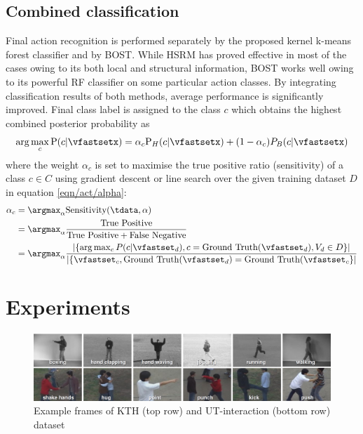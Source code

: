 \subsection{Combined classification} 
Final action recognition is performed separately by the proposed kernel k-means forest classifier and by BOST. While HSRM has proved effective in most of the cases owing to its both local and structural information, BOST works well owing to its powerful RF classifier on some particular action classes. By integrating classification results of both methods, average performance is significantly improved. Final class label is assigned to the class $c$ which obtains the highest combined posterior probability as
\begin{equation}
	\arg\max_{c}\mathrm{P}(c|\vfastsetx) = \alpha_c \mathrm{P}_{H}(c|\vfastsetx) + (1 - \alpha_c) P_{B}(c|\vfastsetx)
	\label{eqn/act/combine}
\end{equation}
where the weight $\alpha_c$ is set to maximise the true positive ratio (sensitivity) of a class $c \in C$ using gradient descent or line search over the given training dataset $D$ in equation \ref{eqn/act/alpha}:
\begin{equation}
\begin{aligned}
	\alpha_c & = \displaystyle\argmax_{\alpha}\mbox{Sensitivity}(\tdata,\alpha) \\
	& = \displaystyle\argmax_{\alpha}\displaystyle\frac{\mbox{True Positive}}{\mbox{True Positive} + \mbox{False Negative}} \\
&= \displaystyle\argmax_{\alpha}\displaystyle\frac{\left|\{\arg\max_{c}P(c|\vfastset_d),c=\mbox{Ground Truth}(\vfastset_d),V_d \in D\}\right|}{\left|\{\vfastset_c, \mbox{Ground Truth}(\vfastset_d) = \mbox{Ground Truth}(\vfastset_c\}\right|}
\end{aligned}
\label{eqn/act/alpha}
\end{equation}

\section{Experiments}
\label{sec/act/experiments}

\begin{figure}[ht]
	\centering
	\includegraphics[width=1\linewidth]{fig/act/frames.png}
	\caption{Example frames of KTH (top row) and UT-interaction (bottom row) dataset}
	\label{fig/act/frames}
\end{figure}

